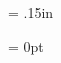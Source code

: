 %
% 
% 
%
%
%
%
%
%
%
%
%
%
%



%
%

\def\captionstyle{}
\def\boxcaptionstyle{\raggedright}

\def\maxfigfraction{.6}%

\newdimen\figboxmargin%
\figboxmargin = .15in

\newdimen\figboxhang%
\figboxhang = 0pt

